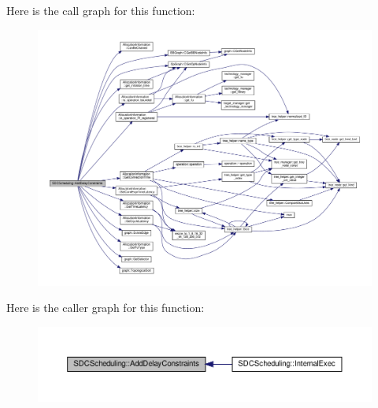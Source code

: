 Here is the call graph for this function\+:
\nopagebreak
\begin{figure}[H]
\begin{center}
\leavevmode
\includegraphics[width=350pt]{d4/dc5/classSDCScheduling_afbe0541a2c1778638bbe1c1251771b8d_cgraph}
\end{center}
\end{figure}
Here is the caller graph for this function\+:
\nopagebreak
\begin{figure}[H]
\begin{center}
\leavevmode
\includegraphics[width=350pt]{d4/dc5/classSDCScheduling_afbe0541a2c1778638bbe1c1251771b8d_icgraph}
\end{center}
\end{figure}
\mbox{\label{classSDCScheduling_a1ba2f8b6af879bd8e641a0604ecaf70c}} 
